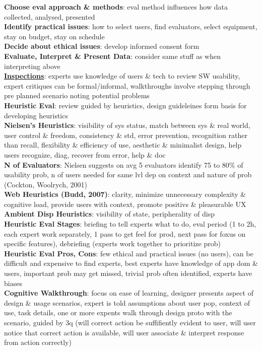 \documentclass[a4paper]{article}
\begin{document}
\begin{multicols}{3}
        \textbf{Choose eval approach \& methods}: eval method influences how data collected, analysed, presented\\
        \textbf{Identify practical issues}: how to select users, find evaluators, select equipment, stay on budget, stay on schedule\\
        \textbf{Decide about ethical issues}: develop informed consent form\\
        \textbf{Evaluate, Interpret \& Present Data}: consider same stuff as when interpreting above\\
        \underline{\textbf{Inspections}}: experts use knowledge of users \& tech to review SW usability, expert critiques can be formal/informal, walkthroughs involve stepping through pre planned scenario noting potential problems\\
        \textbf{Heuristic Eval}: review guided by heuristics, design guideleines form basis for developing heuristics\\
        \textbf{Nielsen's Heuristics}: visibility of sys status, match between sys \& real world, user control \& freedom, consistency \& std, error prevention, recognition rather than recall, flexibility \& efficiency of use, aesthetic \& minimalist design, help users recognize, diag, recover from error, help \& doc\\
        \textbf{N of Evaluators}: Nielsen suggests on avg 5 evaluators identify 75 to 80\% of usability prob, n of users needed for same lvl dep on context and nature of prob (Cockton, Woolrych, 2001)\\
        \textbf{Web Heuristics (Budd, 2007)}: clarity, minimize unnecessary complexity \& cognitive load, provide users with context, promote positivs \& pleasurable UX\\
        \textbf{Ambient Disp Heuristics}: visibility of state, peripherality of disp\\
        \textbf{Heuristic Eval Stages}: briefing to tell experts what to do, eval period (1 to 2h, each expert work separately, 1 pass to get feel for prod, next pass for foxus on specific features), debriefing (experts work together to prioritize prob)\\
        \textbf{Heuristic Eval Pros, Cons}: few ethical and practical issues (no users), can be difficult and expensive to find experts, best experts have knowledge of app dom \& users, important prob may get missed, trivial prob often identified, experts have biases\\
        \textbf{Cognitive Walkthrough}: focus on ease of learning, designer presents aspect of design \& usage scenarios, expert is told assumptions about user pop, context of use, task details, one or more expents walk through design proto with the scenario, guided by 3q (will correct action be suffifiently evident to user, will user notice that correct action is available, will user associate \& interpret response from action correctly)\\

\end{multicols}
\end{document}
